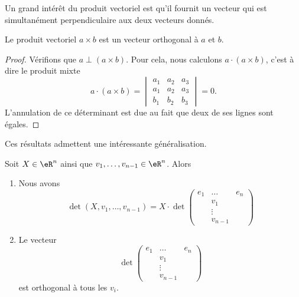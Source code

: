 Un grand intérêt du produit vectoriel est qu'il fournit un vecteur qui est simultanément perpendiculaire aux deux vecteurs donnés.
\begin{proposition}     \label{PROPooTUVKooOQXKKl}
    Le produit vectoriel $a\times b$ est un vecteur orthogonal à $a$ et $b$.
\end{proposition}

\begin{proof}
    Vérifions que $a\perp (a\times b)$. Pour cela, nous calculons $a\cdot (a\times b)$, c'est à dire le produit mixte
    \begin{equation}
        a\cdot(a\times b)=\begin{vmatrix}
            a_1    &   a_2    &   a_3    \\
            a_1    &   a_2    &   a_3    \\
            b_1    &   b_2    &   b_3
        \end{vmatrix}=0.
    \end{equation}
    L'annulation de ce déterminant est due au fait que deux de ses lignes sont égales.
\end{proof}

Ces résultats admettent une intéressante généralisation.
\begin{lemma}       \label{LEMooFRWKooVloCSM}
    Soit \( X\in \eR^n\) ainsi que \( v_1,\ldots, v_{n-1}\in \eR^n\). Alors
    \begin{enumerate}
        \item
            Nous avons
            \begin{equation}        \label{EQooMQNPooRHHBjz}
                \det(X,v_1,\ldots, v_{n-1})=X\cdot 
                \det\begin{pmatrix}
                     e_1   &   \ldots    &   e_n    \\
                        &   v_1    &       \\
                        &   \vdots    &       \\ 
                        &   v_{n-1}    &   
                 \end{pmatrix}
            \end{equation}
        \item
            Le vecteur
            \begin{equation}
                \det\begin{pmatrix}
                     e_1   &   \ldots    &   e_n    \\
                        &   v_1    &       \\
                        &   \vdots    &       \\ 
                        &   v_{n-1}    &   
                 \end{pmatrix}
            \end{equation}
            est orthogonal à tous les \( v_i\).
    \end{enumerate}
\end{lemma}

